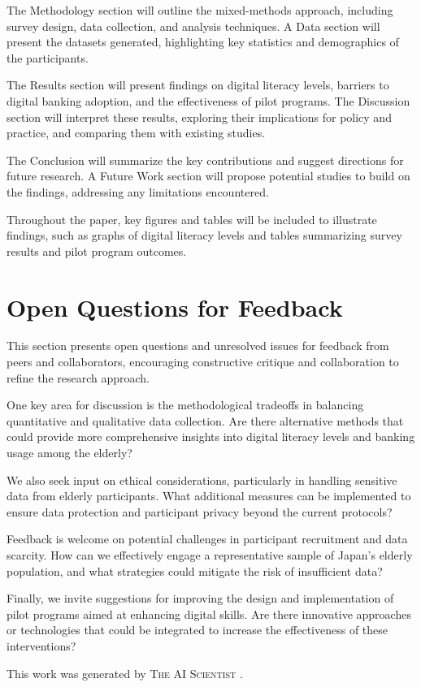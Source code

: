 \documentclass{article} %
\begin{document}
The Methodology section will outline the mixed-methods approach, including survey design, data collection, and analysis techniques. A Data section will present the datasets generated, highlighting key statistics and demographics of the participants.

The Results section will present findings on digital literacy levels, barriers to digital banking adoption, and the effectiveness of pilot programs. The Discussion section will interpret these results, exploring their implications for policy and practice, and comparing them with existing studies.

The Conclusion will summarize the key contributions and suggest directions for future research. A Future Work section will propose potential studies to build on the findings, addressing any limitations encountered.

Throughout the paper, key figures and tables will be included to illustrate findings, such as graphs of digital literacy levels and tables summarizing survey results and pilot program outcomes.

\section{Open Questions for Feedback}
\label{sec:questions}
This section presents open questions and unresolved issues for feedback from peers and collaborators, encouraging constructive critique and collaboration to refine the research approach.

One key area for discussion is the methodological tradeoffs in balancing quantitative and qualitative data collection. Are there alternative methods that could provide more comprehensive insights into digital literacy levels and banking usage among the elderly?

We also seek input on ethical considerations, particularly in handling sensitive data from elderly participants. What additional measures can be implemented to ensure data protection and participant privacy beyond the current protocols?

Feedback is welcome on potential challenges in participant recruitment and data scarcity. How can we effectively engage a representative sample of Japan's elderly population, and what strategies could mitigate the risk of insufficient data?

Finally, we invite suggestions for improving the design and implementation of pilot programs aimed at enhancing digital skills. Are there innovative approaches or technologies that could be integrated to increase the effectiveness of these interventions?

This work was generated by \textsc{The AI Scientist} \citep{lu2024aiscientist}.



\end{document}
